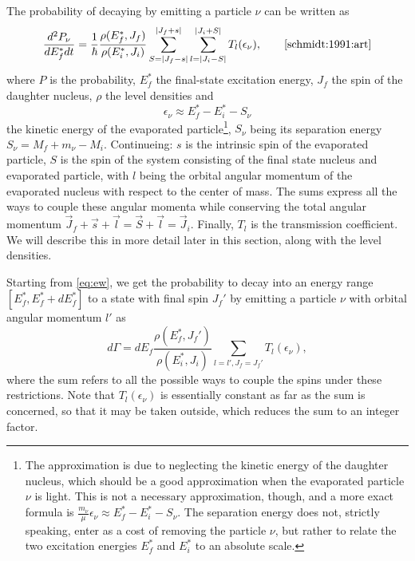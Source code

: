 The probability of decaying by emitting a particle $\nu$ can be written as
\begin{equation}
\frac{d^2 P_\nu}{dE_f^* dt} = \frac{1}{\hbar} \frac{\rho(E_f^*,J_f)}{\rho(E_i^*,J_i)} \sum_{S=|J_f-s|}^{|J_f+s|}\sum_{l=|J_i-S|}^{|J_i+S|} T_l(\epsilon_\nu),\qquad\cite{schmidt:1991:art}\label{eq:ew}
\end{equation}
where $P$ is the probability, $E_f^*$ the final-state excitation energy, $J_f$ the spin of the daughter nucleus, $\rho$ the level densities and 
\begin{equation}
\epsilon_\nu \approx E_f^*-E_i^*-S_\nu\label{eq:kine}
\end{equation}
the kinetic energy of the evaporated particle\footnote{The approximation is due to neglecting the kinetic energy of the daughter nucleus, which should be a good approximation when the evaporated particle $\nu$ is light. This is not a necessary approximation, though, and a more exact formula is $\tfrac{m_\nu}{\mu}\epsilon_\nu \approx E_f^*-E_i^*-S_\nu$. The separation energy does not, strictly speaking, enter as a cost of removing the particle $\nu$, but rather to relate the two excitation energies $E_f^*$ and $E_i^*$ to an absolute scale.}, $S_\nu$ being its separation energy $S_\nu = M_f + m_\nu - M_i$. 
 Continueing: $s$ is the intrinsic spin of the evaporated particle, $S$ is the spin of the system consisting of the final state nucleus and evaporated particle, with $l$ being the orbital angular momentum of the evaporated nucleus with respect to the center of mass. The sums express all the ways to couple these angular momenta while conserving the total angular momentum $\vec{J}_f+\vec{s} +\vec{l}= \vec{S} +\vec{l}= \vec{J}_i$. Finally, $T_l$ is the transmission coefficient. We will describe this in more detail later in this section, along with the level densities.%

Starting from \eqref{eq:ew}, we get the probability to decay into an energy range $[E_f^*,E_f^*+dE_f^*]$ to a state with final spin $J_f'$ by emitting a particle $\nu$ with orbital angular momentum $l'$ as
\begin{equation}
d\Gamma = dE_f \frac{\rho(E_f^*,J_f')}{\rho(E_i^*,J_i)} \sum_{l=l', J_f=J_f'} T_l(\epsilon_\nu),
\end{equation}
where the sum refers to all the possible ways to couple the spins under these restrictions. Note that $T_l(\epsilon_\nu)$ is essentially constant as far as the sum is concerned, so that it may be taken outside, which reduces the sum to an integer factor. 

